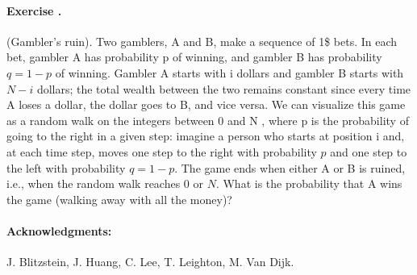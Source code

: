 \documentclass[twocolumn,12pt,a4paper]{article}
\newcounter{num}  %
\begin{document}
\paragraph{Exercise \thenum.}
(Gambler's ruin). Two gamblers, A and B, make a sequence of
1\$ bets. In each bet, gambler A has probability p of winning, and gambler B has probability $q = 1 - p$ of winning. Gambler A starts with i dollars and gambler B starts with $N - i$ dollars; the total wealth between the two remains constant since every time A loses a dollar, the dollar goes to B, and vice versa.
We can visualize this game as a random walk on the integers between 0 and N , where p is the probability of going to the right in a given step: imagine a person who starts at position i and, at each time step, moves one step to the right with probability $p$ and one step to the left with probability $q = 1 - p$. 
The game ends when either A or B is ruined, i.e., when the random walk reaches 0 or $N$. 
What is the probability that A wins the game (walking away with all the money)?

\iffalse
\stepcounter{num} 
\paragraph{Exercise \thenum.}
An immortal drunk man wanders around randomly on the integers. 
He starts at the origin, and at each step he moves 1 unit to the right or 1 unit to the left, with equal probabilities, independently of all
his previous steps. 
Let $b$ be a googolplex (this is $10g$, where $g = 10^{100}$ is a googol).
\begin{enumerate}
	\item Find a simple expression for the probability that the immortal drunk visits $b$ before returning to the origin for the first time.
	\item Find the expected number of times that the immortal drunk visits $b$ before returning to the origin for the first time.
\end{enumerate}
\fi

\paragraph{Acknowledgments: } J. Blitzstein, J. Huang, C. Lee, T. Leighton, M. Van Dijk.
\end{document}
